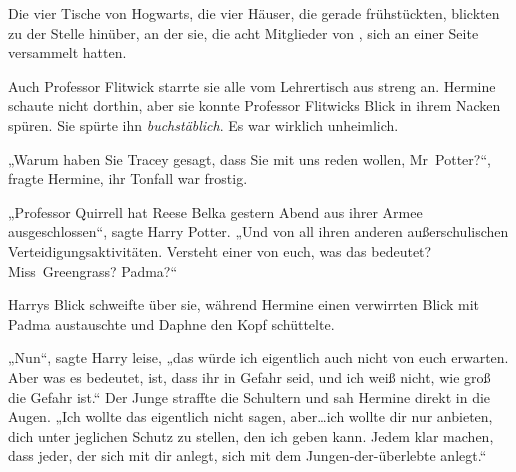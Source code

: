Die vier Tische von Hogwarts, die vier Häuser, die gerade frühstückten, blickten zu der Stelle hinüber, an der sie, die acht Mitglieder von \SPHEW, sich an einer Seite versammelt hatten.

Auch Professor Flitwick starrte sie alle vom Lehrertisch aus streng an. Hermine schaute nicht dorthin, aber sie konnte Professor Flitwicks Blick in ihrem Nacken spüren. Sie spürte ihn \emph{buchstäblich}. Es war wirklich unheimlich.

„Warum haben Sie Tracey gesagt, dass Sie mit uns reden wollen, Mr~Potter?“, fragte Hermine, ihr Tonfall war frostig.

„Professor Quirrell hat Reese Belka gestern Abend aus ihrer Armee ausgeschlossen“, sagte Harry Potter. „Und von all ihren anderen außerschulischen Verteidigungsaktivitäten. Versteht einer von euch, was das bedeutet? Miss~Greengrass? Padma?“

Harrys Blick schweifte über sie, während Hermine einen verwirrten Blick mit Padma austauschte und Daphne den Kopf schüttelte.

„Nun“, sagte Harry leise, „das würde ich eigentlich auch nicht von euch erwarten. Aber was es bedeutet, ist, dass ihr in Gefahr seid, und ich weiß nicht, wie groß die Gefahr ist.“ Der Junge straffte die Schultern und sah Hermine direkt in die Augen. „Ich wollte das eigentlich nicht sagen, aber…ich wollte dir nur anbieten, dich unter jeglichen Schutz zu stellen, den ich geben kann. Jedem klar machen, dass jeder, der sich mit dir anlegt, sich mit dem Jungen-der-überlebte anlegt.“

